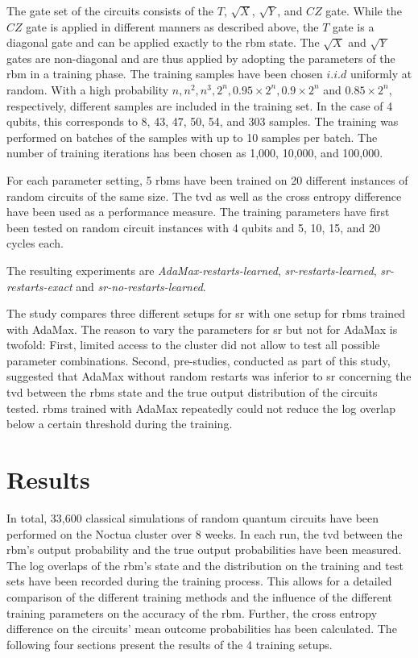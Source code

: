 The gate set of the circuits consists of the $T$, $\sqrt{X}$, $\sqrt{Y}$, and $CZ$ gate. While the $CZ$ gate is 
applied in different manners as described above, the $T$ gate is a diagonal gate and can be applied exactly to the \gls{rbm} state.
The $\sqrt{X}$ and $\sqrt{Y}$ gates are non-diagonal and are thus applied by adopting the parameters of the \gls{rbm} in 
a training phase. The training samples have been chosen $i.i.d$ uniformly at random. 
With a high probability $n, n^2, n^3, 2^n, 0.95 \times 2^n, 0.9 \times 2^n$ and $0.85 \times 2^n$,
respectively, different samples are included in the training set. In the case of 4 qubits, this corresponds to 
8, 43, 47, 50, 54, and 303 samples. The training was performed on batches of the samples with 
up to 10 samples per batch.
The number of training iterations has been chosen as 1,000, 10,000, and 100,000. 

For each parameter setting, 5 \gls{rbm}s have been trained on 20 different instances of random circuits of the same 
size. The \gls{tvd} as well as the cross entropy difference have been used as a performance measure.
The training parameters have first been tested on random circuit instances with 4 qubits and 
5, 10, 15, and 20 cycles each. 

The resulting experiments are \textit{AdaMax-restarts-learned}, \textit{sr-restarts-learned}, 
\textit{sr-restarts-exact} and \textit{sr-no-restarts-learned}. 

The study compares three different setups for \gls{sr} with one setup for \gls{rbm}s trained with 
AdaMax. The reason to vary the parameters for \gls{sr} but not for AdaMax is twofold:
First, limited access to the cluster did not allow to test all possible parameter combinations. Second,
pre-studies, conducted as part of this study, suggested that AdaMax without random restarts 
was inferior to \gls{sr} concerning the \gls{tvd} between the \gls{rbm}s state and the true output distribution of the 
circuits tested. \gls{rbm}s trained with AdaMax repeatedly could not reduce the 
log overlap below a certain threshold during the training.

\section{Results}
\label{sec:results}

In total, 33,600 classical simulations of random quantum circuits have been performed 
on the Noctua cluster over 8 weeks. In each run, the \gls{tvd}
between the \gls{rbm}'s output probability and the true output probabilities have been measured.
 The log overlaps of the \gls{rbm}'s state and the distribution on the training and test sets have been recorded during the training process. This allows for a detailed comparison
of the different training methods and the influence of the different training parameters on the 
accuracy of the \gls{rbm}. Further, the cross entropy difference on the circuits' mean outcome probabilities
has been calculated. The following four sections present the results of the 4 training setups.

